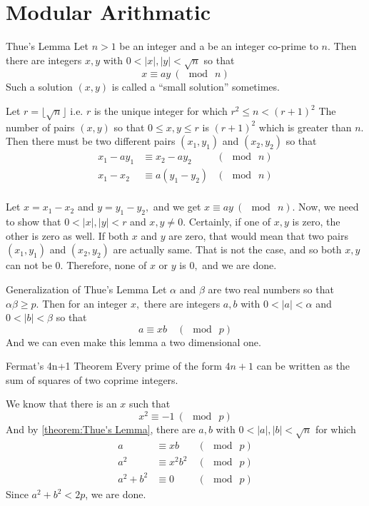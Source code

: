 \section{Modular Arithmatic}

{Thue's Lemma}{
    Let $n>1$ be an integer and a be an integer co-prime to $n$. Then there
    are integers $x, y$ with $0<|x|,|y|<\sqrt{n}$ so that
    \[ x \equiv a y \ (\mod\ n) \]
    Such a solution $(x, y)$ is called a ``small solution'' sometimes.
}

\begin{prooof}
    Let $r=\lfloor\sqrt{n}\rfloor$ i.e. $r$ is the unique integer for which
    $r^{2} \leq n<(r+1)^{2}$ The number of pairs $(x, y)$ so that $0 \leq x, y
    \leq r$ is $(r+1)^{2}$ which is greater than $n .$ Then there must be two
    different pairs $\left(x_{1}, y_{1}\right)$ and $\left(x_{2},
    y_{2}\right)$ so that
    \[\begin{aligned}
        x_{1}-a y_{1} &\equiv x_{2}-a y_{2} &(\mod\ n) \\
        x_{1}-x_{2} &\equiv a\left(y_{1}-y_{2}\right) &(\mod\ n) \\
    \end{aligned}\]

    Let $x=x_{1}-x_{2}$ and $y=y_{1}-y_{2},$ and we get $x \equiv a y\ (\mod\ n)$.
    Now, we need to show that $0<|x|,|y|<r$ and $x, y \neq 0 .$ Certainly, if
    one of $x, y$ is zero, the other is zero as well. If both $x$ and $y$ are
    zero, that would mean that two pairs $\left(x_{1}, y_{1}\right)$ and
    $\left(x_{2}, y_{2}\right)$ are actually same. That is not the case, and so
    both $x, y$ can not be $0 .$ Therefore, none of $x$ or $y$ is $0,$ and we are
    done.
\end{prooof}

\theo{}
{Generalization of Thue's Lemma}{
    Let $\alpha$ and $\beta$ are two real numbers so that $\alpha \beta \geq p$. 
    Then for an integer $x,$ there are integers $a, b$ with $0<|a|<\alpha$
    and $0<|b|<\beta$ so that
    \[a \equiv x b \quad(\mod\ p) \]
    And we can even make this lemma a two dimensional one.
}


\thmbox{}
{Fermat's 4n+1 Theorem}{
    Every prime of the form $4n+1$ can be written as the sum of squares of two
    coprime integers.
}

\begin{prooof}
    We know that there is an $x$ such that 
    \[x^2 \equiv -1 \ (\mod\ p)\] 
    And by \autoref{theorem:Thue's Lemma}, there are $a, b$ with
    $0<\left|a\right|, \left|b\right|< \sqrt{n}$ for which
    \[\begin{aligned}
        a &\equiv xb \ &(\mod\ p)\\
        a^2 &\equiv x^2b^2 \ &(\mod\ p)\\
        a^2 + b^2 &\equiv 0 \ &(\mod\ p)
    \end{aligned}\] 
    Since $a^2+ b^2 < 2p$, we are done.
\end{prooof}

